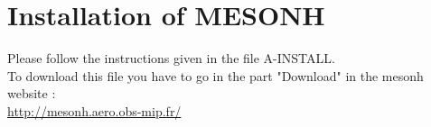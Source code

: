 \chapter{Installation of MESONH}

Please follow the instructions given in the file  A-INSTALL.\\
To download this file you have to go in the part "Download" in the mesonh website : \\
\url{http://mesonh.aero.obs-mip.fr/}
	



